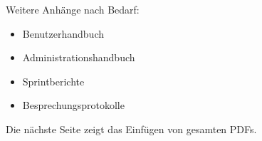 \documentclass[
	papersize=A4,
	fontsize=12pt, 
	laterality=oneside, 
	draft=false,
	parskip=half,
	BCOR=0mm,
	linespread=1.15,
	language={english,ngerman},
	biblatex, %
	bibfile=99--references.bib,
	biblatexstyle=alphabetic,
	biblatexdashed=false,  %
	biblatexbackref=true,  %
	bibtexstyle=alpha, 
	dispositioncolor={30,103,182},
	colorlinks=true, %
    titlepage=titlepage,
	todonotesoptions={color=Dandelion,bordercolor=white},
	addcolophon=false, %
	addlistoftodos=false, %
]{longdoc}
\begin{document}










% 

\appendix


\LDinsertbibliography

\listoffigures

\listoftables









Weitere Anhänge nach Bedarf:

\begin{itemize}
\item Benutzerhandbuch
\item Administrationshandbuch
\item Sprintberichte
\item  Besprechungsprotokolle
\end{itemize}

Die nächste Seite zeigt das Einfügen von gesamten PDFs.
% 


\end{document}
